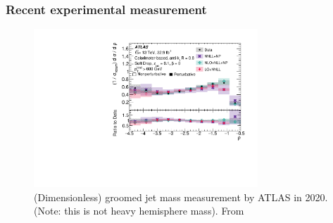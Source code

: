 \documentclass{beamer}
\begin{document}
	\begin{frame}
		\frametitle{Recent experimental measurement}
		\begin{figure}
			\includegraphics[width=0.75\textwidth]{figures/atlas_mass_measurement.pdf}

			\caption{(Dimensionless) groomed jet mass measurement by ATLAS in 2020. (Note: this is not heavy hemisphere mass). From \cite{atlas_collaboration_measurement_2020}}
		\end{figure}
	\end{frame}
\end{document}
